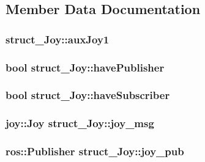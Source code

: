\subsection{Member Data Documentation}
\hypertarget{classstruct__Joy_a53d67349adb0afbdc4d30eead0903f21}{
\subsubsection[{auxJoy1}]{ {\bf struct\_\-Joy::auxJoy1}}}
\label{classstruct__Joy_a53d67349adb0afbdc4d30eead0903f21}
\hypertarget{classstruct__Joy_a766b261da0d33afd7a1b0319be93b0cb}{
\subsubsection[{havePublisher}]{\setlength{\rightskip}{0pt plus 5cm}bool {\bf struct\_\-Joy::havePublisher}}}
\label{classstruct__Joy_a766b261da0d33afd7a1b0319be93b0cb}
\hypertarget{classstruct__Joy_a350d227f222fa989e455d9ca0f28e106}{
\subsubsection[{haveSubscriber}]{\setlength{\rightskip}{0pt plus 5cm}bool {\bf struct\_\-Joy::haveSubscriber}}}
\label{classstruct__Joy_a350d227f222fa989e455d9ca0f28e106}
\hypertarget{classstruct__Joy_a1abf576689f865066505c7d3931cf175}{
\subsubsection[{joy\_\-msg}]{\setlength{\rightskip}{0pt plus 5cm}joy::Joy {\bf struct\_\-Joy::joy\_\-msg}}}
\label{classstruct__Joy_a1abf576689f865066505c7d3931cf175}
\hypertarget{classstruct__Joy_ae2f0324335e5f6692d1e398c80c84979}{
\subsubsection[{joy\_\-pub}]{\setlength{\rightskip}{0pt plus 5cm}ros::Publisher {\bf struct\_\-Joy::joy\_\-pub}}}
